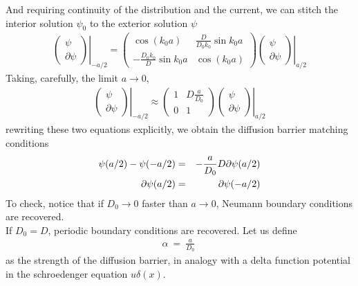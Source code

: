\documentclass[aps,pre,floats,floatfix,fleqn,notitlepage]{revtex4-1}
\newcommand{\mylabel}[1]{\label{#1}}  %
\newcommand{\beq}{\begin{eqnarray}}
\newcommand{\eeq}{\end{eqnarray}}
\newcommand{\be}[1]{\begin{eqnarray}\ifthenelse{#1=-1}{\nonumber}{\ifthenelse{#1=0}{}{\mylabel{e#1}}}}
\newcommand{\ee}{\end{eqnarray}}
\begin{document}
And requiring continuity of the distribution and the current, we can stitch the interior solution $\psi_0$ to the exterior solution $\psi$
%
\beq
\left.\left( \begin{array}{c}
\psi\\
\partial \psi
\end{array}
\right)\right|_{-a/2}  = 
\left( \begin{array}{cc}
\cos(k_0a) & \frac{D}{D_0 k_0} \sin{k_0a} \\
-\frac{D_0 k_0}{D} \sin{k_0a} & \cos(k_0a)
\end{array}
\right)
\left.\left( \begin{array}{c}
\psi \\
\partial \psi
\end{array}
\right)\right|_{a/2}
\eeq
%
Taking, carefully, the limit $a\to 0$, 
%
\beq
\left.\left( \begin{array}{c}
\psi\\
\partial \psi
\end{array}
\right)\right|_{-a/2}  \approx
\left( \begin{array}{cc}
1 & D\frac{a}{D_0 }  \\
0 & 1
\end{array}
\right)
\left.\left( \begin{array}{c}
\psi \\
\partial \psi
\end{array}
\right)\right|_{a/2}
\eeq
%
rewriting these two equations explicitly, we obtain the diffusion barrier matching conditions
%
\be{6}
\psi(a/2)-\psi(-a/2) &=& -\frac{a}{D_0}D \partial \psi(a/2)\\
\partial \psi(a/2) &=& \partial \psi(-a/2) 
\ee
%
To check, notice that if $D_0 \to 0$ faster than $a\to 0$, Neumann boundary conditions are recovered.\\
If $D_0=D$, periodic boundary conditions are recovered. 
Let us define 
%
\beq
\alpha \ = \ \frac{a}{D_0}\
\eeq
%
as the strength of the diffusion barrier, in analogy with a delta function potential in the schroedenger equation $u\delta(x)$.
\end{document}
